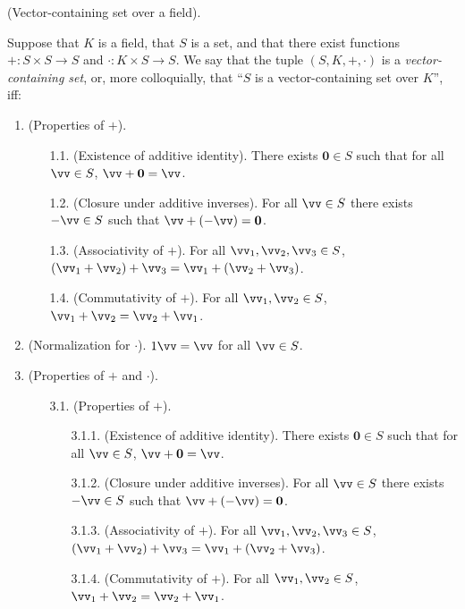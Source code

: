 \begin{defn}
\label{ch::lin_alg::defn::vector_space}
    (Vector-containing set over a field).
    
    Suppose that $K$ is a field, that $S$ is a set, and that there exist functions $+:S \times S \rightarrow S$ and $\cdot:K \times S \rightarrow S$. We say that the tuple $(S, K, +, \cdot)$ is a \textit{vector-containing set}, or, more colloquially, that ``$S$ is a vector-containing set over $K$'', iff:
    
    \begin{enumerate}
        \item (Properties of $+$).
        \begin{enumerate}
                \item[1.1.] (Existence of additive identity). There exists $\mathbf{0} \in S$ such that for all $\vv \in S$, $\vv + \mathbf{0} = \vv$.
                \item[1.2.] (Closure under additive inverses). For all $\vv \in S$ there exists $-\vv \in S$ such that $\vv + (-\vv) = \mathbf{0}$.
                \item[1.3.] (Associativity of $+$). For all $\vv_1, \vv_2, \vv_3 \in S$, $(\vv_1 + \vv_2) + \vv_3 = \vv_1 + (\vv_2 + \vv_3)$.
                \item[1.4.] (Commutativity of $+$). For all $\vv_1, \vv_2 \in S$, $\vv_1 + \vv_2 = \vv_2 + \vv_1$.
            \end{enumerate}
        \item (Normalization for $\cdot$). $1 \vv = \vv$ for all $\vv \in S$.
        \item (Properties of $+$ and $\cdot$).
        \begin{enumerate}
            \item[3.1.] (Properties of $+$).
            \begin{enumerate}
                \item[3.1.1.] (Existence of additive identity). There exists $\mathbf{0} \in S$ such that for all $\vv \in S$, $\vv + \mathbf{0} = \vv$.
                \item[3.1.2.] (Closure under additive inverses). For all $\vv \in S$ there exists $-\vv \in S$ such that $\vv + (-\vv) = \mathbf{0}$.
                \item[3.1.3.] (Associativity of $+$). For all $\vv_1, \vv_2, \vv_3 \in S$, $(\vv_1 + \vv_2) + \vv_3 = \vv_1 + (\vv_2 + \vv_3)$.
                \item[3.1.4.] (Commutativity of $+$). For all $\vv_1, \vv_2 \in S$, $\vv_1 + \vv_2 = \vv_2 + \vv_1$.

\end{enumerate}
\end{enumerate}
\end{enumerate}
\end{defn}
